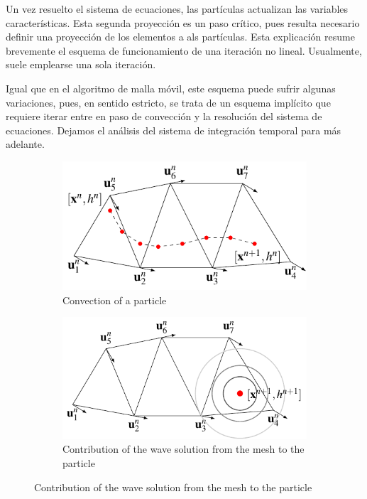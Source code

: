 
Un vez resuelto el sistema de ecuaciones, las partículas actualizan las variables características. Esta segunda proyección es un paso crítico, pues resulta necesario definir una proyección de los elementos a als partículas. Esta explicación resume brevemente el esquema de funcionamiento de una iteración no lineal. Usualmente, suele emplearse una sola iteración.

Igual que en el algoritmo de malla móvil, este esquema puede sufrir algunas variaciones, pues, en sentido estricto, se trata de un esquema implícito que requiere iterar entre en paso de convección y la resolución del sistema de ecuaciones. Dejamos el análisis del sistema de integración temporal para más adelante.

\begin{figure}
\begin{subfigure}{0.48\textwidth}
    \centering
    \includegraphics[width=\textwidth]{img/lagrangian/pfem2_convection_stage.pdf}
    \caption{Convection of a particle}
    \label{pfem2_convection_stage}
\end{subfigure}
\hfill
\begin{subfigure}{0.48\textwidth}
    \centering
    \includegraphics[width=\textwidth]{img/lagrangian/pfem2_wave_stage.pdf}
    \caption{Contribution of the wave solution from the mesh to the particle}
    \label{pfem2_wave_stage}
\end{subfigure}
\end{figure}

